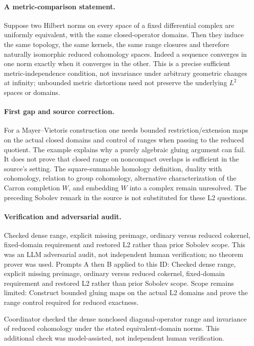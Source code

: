 \documentclass[11pt]{article}
\begin{document}
\paragraph{A metric-comparison statement.}Suppose two Hilbert norms on every space of a fixed differential complex are uniformly equivalent, with the same closed-operator domains. Then they induce the same topology, the same kernels, the same range closures and therefore naturally isomorphic reduced cohomology spaces. Indeed a sequence converges in one norm exactly when it converges in the other. This is a precise sufficient metric-independence condition, not invariance under arbitrary geometric changes at infinity; unbounded metric distortions need not preserve the underlying \(L^2\) spaces or domains.
\paragraph{First gap and source correction.}For a Mayer--Vietoris construction one needs bounded restriction/extension maps on the actual closed domains and control of ranges when passing to the reduced quotient. The example explains why a purely algebraic gluing argument can fail. It does not prove that closed range on noncompact overlaps is sufficient in the source's setting. The square-summable homology definition, duality with cohomology, relation to group cohomology, alternative characterization of the Carron completion \(W\), and embedding \(W\) into a complex remain unresolved. The preceding Sobolev remark in the source is not substituted for these L2 questions.

\paragraph{Verification and adversarial audit.}
Checked dense range, explicit missing preimage, ordinary versus reduced cokernel, fixed-domain requirement and restored L2 rather than prior Sobolev scope. This was an LLM adversarial audit, not independent human verification; no theorem prover was used. Prompts A then B applied to this ID: Checked dense range, explicit missing preimage, ordinary versus reduced cokernel, fixed-domain requirement and restored L2 rather than prior Sobolev scope. Scope remains limited: Construct bounded gluing maps on the actual L2 domains and prove the range control required for reduced exactness.

Coordinator checked the dense nonclosed diagonal-operator range and invariance of reduced cohomology under the stated equivalent-domain norms. This additional check was model-assisted, not independent human verification.
\end{document}
